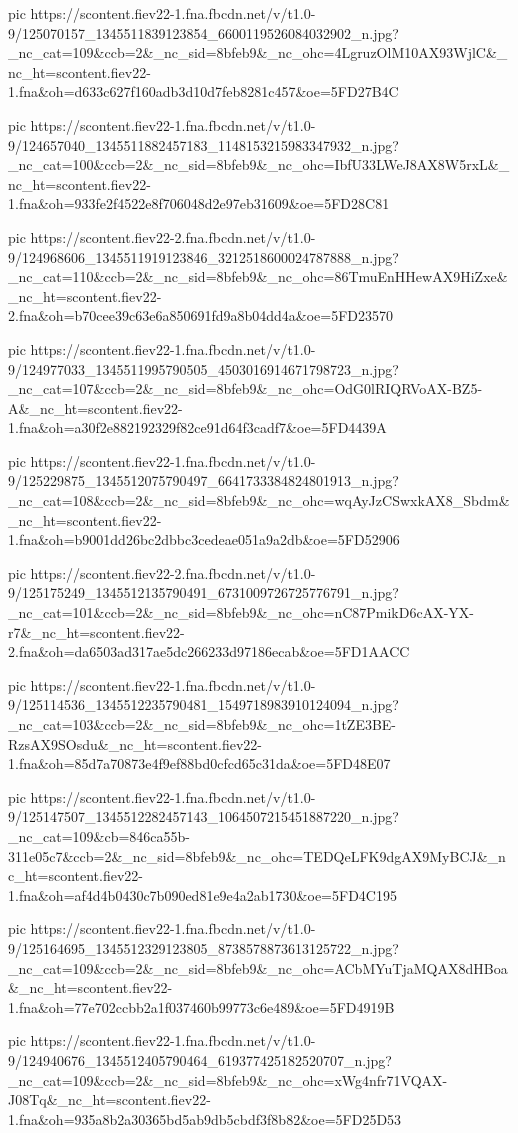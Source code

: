 pic https://scontent.fiev22-1.fna.fbcdn.net/v/t1.0-9/125070157_1345511839123854_6600119526084032902_n.jpg?_nc_cat=109&ccb=2&_nc_sid=8bfeb9&_nc_ohc=4LgruzOlM10AX93WjlC&_nc_ht=scontent.fiev22-1.fna&oh=d633c627f160adb3d10d7feb8281c457&oe=5FD27B4C

pic https://scontent.fiev22-1.fna.fbcdn.net/v/t1.0-9/124657040_1345511882457183_1148153215983347932_n.jpg?_nc_cat=100&ccb=2&_nc_sid=8bfeb9&_nc_ohc=IbfU33LWeJ8AX8W5rxL&_nc_ht=scontent.fiev22-1.fna&oh=933fe2f4522e8f706048d2e97eb31609&oe=5FD28C81

pic https://scontent.fiev22-2.fna.fbcdn.net/v/t1.0-9/124968606_1345511919123846_3212518600024787888_n.jpg?_nc_cat=110&ccb=2&_nc_sid=8bfeb9&_nc_ohc=86TmuEnHHewAX9HiZxe&_nc_ht=scontent.fiev22-2.fna&oh=b70cee39c63e6a850691fd9a8b04dd4a&oe=5FD23570

pic https://scontent.fiev22-1.fna.fbcdn.net/v/t1.0-9/124977033_1345511995790505_4503016914671798723_n.jpg?_nc_cat=107&ccb=2&_nc_sid=8bfeb9&_nc_ohc=OdG0lRIQRVoAX-BZ5-A&_nc_ht=scontent.fiev22-1.fna&oh=a30f2e882192329f82ce91d64f3cadf7&oe=5FD4439A

pic https://scontent.fiev22-1.fna.fbcdn.net/v/t1.0-9/125229875_1345512075790497_6641733384824801913_n.jpg?_nc_cat=108&ccb=2&_nc_sid=8bfeb9&_nc_ohc=wqAyJzCSwxkAX8_Sbdm&_nc_ht=scontent.fiev22-1.fna&oh=b9001dd26bc2dbbc3cedeae051a9a2db&oe=5FD52906

pic https://scontent.fiev22-2.fna.fbcdn.net/v/t1.0-9/125175249_1345512135790491_6731009726725776791_n.jpg?_nc_cat=101&ccb=2&_nc_sid=8bfeb9&_nc_ohc=nC87PmikD6cAX-YX-r7&_nc_ht=scontent.fiev22-2.fna&oh=da6503ad317ae5dc266233d97186ecab&oe=5FD1AACC

pic https://scontent.fiev22-1.fna.fbcdn.net/v/t1.0-9/125114536_1345512235790481_1549718983910124094_n.jpg?_nc_cat=103&ccb=2&_nc_sid=8bfeb9&_nc_ohc=1tZE3BE-RzsAX9SOsdu&_nc_ht=scontent.fiev22-1.fna&oh=85d7a70873e4f9ef88bd0cfcd65c31da&oe=5FD48E07

pic https://scontent.fiev22-1.fna.fbcdn.net/v/t1.0-9/125147507_1345512282457143_1064507215451887220_n.jpg?_nc_cat=109&cb=846ca55b-311e05c7&ccb=2&_nc_sid=8bfeb9&_nc_ohc=TEDQeLFK9dgAX9MyBCJ&_nc_ht=scontent.fiev22-1.fna&oh=af4d4b0430c7b090ed81e9e4a2ab1730&oe=5FD4C195

pic https://scontent.fiev22-1.fna.fbcdn.net/v/t1.0-9/125164695_1345512329123805_8738578873613125722_n.jpg?_nc_cat=109&ccb=2&_nc_sid=8bfeb9&_nc_ohc=ACbMYuTjaMQAX8dHBoa&_nc_ht=scontent.fiev22-1.fna&oh=77e702ccbb2a1f037460b99773c6e489&oe=5FD4919B

pic https://scontent.fiev22-1.fna.fbcdn.net/v/t1.0-9/124940676_1345512405790464_619377425182520707_n.jpg?_nc_cat=109&ccb=2&_nc_sid=8bfeb9&_nc_ohc=xWg4nfr71VQAX-J08Tq&_nc_ht=scontent.fiev22-1.fna&oh=935a8b2a30365bd5ab9db5cbdf3f8b82&oe=5FD25D53

